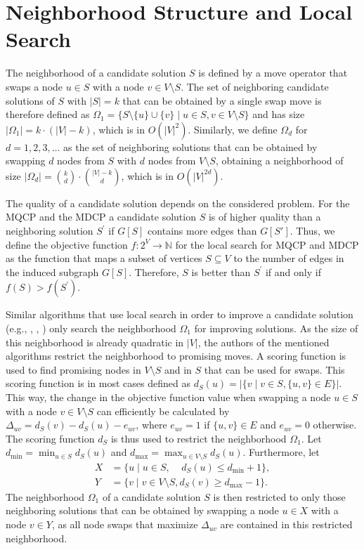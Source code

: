\documentclass[draft,final]{vutinfth} %
\begin{document}
\section{Neighborhood Structure and Local Search} \label{sec:neighborhood-structure}

The neighborhood of a candidate solution $S$ is defined by a move operator that swaps a node $u \in S$ with a node $v \in V \setminus S$. The set of neighboring candidate solutions of $S$ with $|S| = k$ that can be obtained by a single swap move is therefore defined as $\Omega_1 = \{ S \setminus \{u\} \cup \{v\} \mid u \in S, v \in V \setminus S \}$ and has size $|\Omega_1| = k \cdot (|V|-k)$, which is in $O(|V|^2)$. Similarly, we define $\Omega_d$ for $d=1,2,3,\dots$ as the set of neighboring solutions that can be obtained by swapping $d$ nodes from $S$ with $d$ nodes from $V \setminus S$, obtaining a neighborhood of size $|\Omega_d| = \binom{k}{d} \cdot \binom{|V|-k}{d}$, which is in $O(|V|^{2d})$. 


The quality of a candidate solution depends on the considered problem. For the MQCP and the MDCP a candidate solution $S$ is of higher quality than a neighboring solution $S^\prime$ if $G[S]$ contains more edges than $G[S']$. Thus, we define the objective function $f \colon 2^V \rightarrow \mathbb{N}$ for the local search for MQCP and MDCP as the function that maps a subset of vertices $S \subseteq V$ to the number of edges in the induced subgraph $G[S]$. Therefore, $S$ is better than $S^\prime$ if and only if $f(S) > f(S^\prime)$. 

Similar algorithms that use local search in order to improve a candidate solution (e.g.,  \cite{chen_nuqclq_2021}, \cite{djeddi_extension_2019}, \cite{zhou_opposition-based_2020}) only search the neighborhood $\Omega_1$ for improving solutions. As the size of this neighborhood is already quadratic in $|V|$, the authors of the mentioned algorithms restrict the neighborhood to promising moves. A scoring function is used to find promising nodes in $V \setminus S$ and in $S$ that can be used for swaps. This scoring function is in most cases defined as $d_S(u) = |\{v \mid v \in S, \{u,v\} \in E \}|$. This way, the change in the objective function value when swapping a node $u \in S$ with a node $v \in V \setminus S$ can efficiently be calculated by $\Delta_{uv} = d_S(v) - d_S(u) - e_{uv}$, where $e_{uv} = 1$ if $\{u,v\} \in E$ and $e_{uv} = 0$ otherwise. 
The scoring function $d_S$ is thus used to restrict the neighborhood $\Omega_1$. 
Let $d_{\min} = \min_{u \in S} d_S(u)$ and $d_{\max} = \max_{u \in V \setminus S} d_S(u)$.
Furthermore, let 
\begin{align*}
    X &= \{ u \mid u \in S,~~~~~ d_S(u) \leq d_{\min} + 1 \}, \\
    Y &= \{ v \mid v \in V \setminus S, d_S(v) \geq d_{\max} - 1 \}.
\end{align*} The neighborhood $\Omega_1$ of a candidate solution $S$ is then restricted to only those neighboring solutions that can be obtained by swapping a node $u \in X$ with a node $v \in Y$, as all node swaps that maximize $\Delta_{uv}$ are contained in this restricted neighborhood. 
\end{document}

